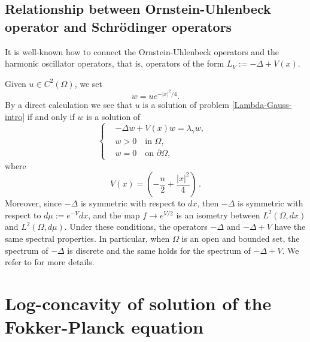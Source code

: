 \documentclass[12pt]{amsart}
\newcommand{\R}{\mathbb R}
\newcommand{\1}{\mathbf 1}
\begin{document}
\subsection{Relationship between Ornstein-Uhlenbeck operator and Schr\"{o}dinger operators}\label{Se3-2}

It is well-known how to connect the Ornstein-Uhlenbeck operators and the harmonic oscillator operators, that is, operators of the form $L_V:=-\Delta+V(x)$.

Given $u\in C^2(\Omega)$, we set
\[
w=u e^{-|x|^2/4}.
\]
By a direct calculation we see that $u$ is a solution of problem \eqref{Lambda-Gauss-intro} if and only if $w$ is a solution of
\begin{equation}\nonumber
\left\{
\begin{aligned}
& -\Delta w + V(x)w=\lambda_\gamma w, \ \ \   \\
& w>0\quad\mbox{in $\Omega$}, \\
& w=0\quad\mbox{on $\partial\Omega$},
\end{aligned}
\right.
\end{equation}
where
$$
V(x)=\left(-\frac{n}{2}+\frac{|x|^2}{4} \right)\,.
$$
Moreover, since $-\Delta$ is symmetric with respect to $dx$, then $-\Delta$ is symmetric with respect to $d\mu:=e^{-V}dx$, and the map $f\rightarrow e^{V/2}$ is an isometry between $L^2(\Omega,dx)$ and $L^2(\Omega,d\mu)$. Under these conditions, the operators $-\Delta$ and $-\Delta+V$ have the same spectral properties. In particular, when $\Omega$ is an open and bounded set, the spectrum of $-\Delta$ is discrete and the same holds for the spectrum of $-\Delta+V$. We refer to \cite{Colesanti2025} for more details.



\section{Log-concavity of solution of the Fokker-Planck equation}\label{Se4}
\end{document}
